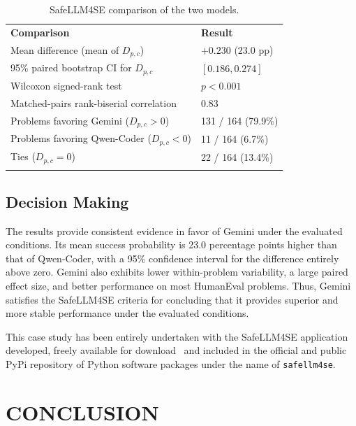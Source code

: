 \documentclass{IEEEcsmag}
\begin{document}
\begin{table}
	\vspace*{4pt}
	\caption{SafeLLM4SE comparison of the two models.}
	\label{table:case-study-comparison}
	\begin{tabular*}{\linewidth}{@{\extracolsep\fill} p{6.0cm} p{4.0cm}}
		\toprule
		\textbf{Comparison} & \textbf{Result} \\
		\colrule
		Mean difference (mean of $D_{p,c}$) &
		$+0.230$ (23.0 pp) \\
		95\% paired bootstrap CI for $D_{p,c}$ &
		$[0.186, 0.274]$ \\
		Wilcoxon signed-rank test &
		$p < 0.001$ \\
		Matched-pairs rank-biserial correlation &
		$0.83$ \\
		Problems favoring Gemini ($D_{p,c} > 0$) &
		131 / 164 (79.9\%) \\
		Problems favoring Qwen-Coder  ($D_{p,c} < 0$)&
		11 / 164 (6.7\%) \\
		Ties ($D_{p,c} = 0$) &
		22 / 164 (13.4\%) \\
		\botrule
	\end{tabular*}
	\vspace*{8pt}
\end{table}


\subsection{Decision Making}

The results provide consistent evidence in favor of Gemini under the evaluated conditions. Its mean success probability is 23.0 percentage points higher than that of Qwen-Coder, with a 95\% confidence interval for the difference entirely above zero. Gemini also exhibits lower within-problem variability, a large paired effect size, and better performance on most HumanEval problems. Thus, Gemini satisfies the SafeLLM4SE criteria for concluding that it provides superior and more stable performance under the evaluated conditions.

This case study has been entirely undertaken with the SafeLLM4SE application developed, freely available for download~\cite{ref} and included in the official and public PyPi repository of Python software packages under the name of \texttt{safellm4se}.


\vspace*{-8pt}
\section{CONCLUSION}
\label{section:conclusion}
\end{document}
